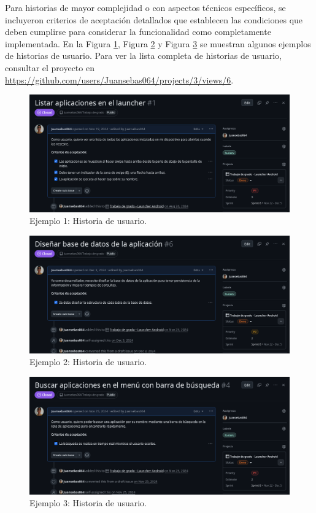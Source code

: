 Para historias de mayor complejidad o con aspectos técnicos específicos, se incluyeron criterios de aceptación detallados que establecen las condiciones que deben cumplirse para considerar la funcionalidad como completamente implementada. En la Figura \ref{fig:historia_de_usuario_1}, Figura \ref{fig:historia_de_usuario_2} y Figura \ref{fig:historia_de_usuario_3} se muestran algunos ejemplos de historias de usuario. Para ver la lista completa de historias de usuario, consultar el proyecto en \url{https://github.com/users/Juansebas064/projects/3/views/6}.

\begin{figure}[ht]
  \caption{Ejemplo 1: Historia de usuario.}
  \label{fig:historia_de_usuario_1}
  \includegraphics[width=\textwidth]{Figuras/historia_de_usuario_1.png}
  \centering
\end{figure}

\begin{figure}[ht]
  \caption{Ejemplo 2: Historia de usuario.}
  \label{fig:historia_de_usuario_2}
  \includegraphics[width=\textwidth]{Figuras/historia_de_usuario_2.png}
  \centering
\end{figure}

\begin{figure}[ht]
  \caption{Ejemplo 3: Historia de usuario.}
  \label{fig:historia_de_usuario_3}
  \includegraphics[width=\textwidth]{Figuras/historia_de_usuario_3.png}
  \centering
\end{figure}

